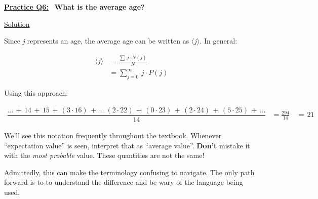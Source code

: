 \underline{\textbf{Practice Q6:}} \ \textbf{What is the average age?}

\bigskip

\underline{Solution}

Since \textit{j} represents an age, the average age can be written as
$\langle j \rangle$. In general:

\begin{align*}
    \langle j \rangle &= \frac{\sum \, j \cdot N(j)}{N} \\[1.5ex]
    &= \sum_{j=0}^{\infty} \, j \cdot P(j)
\end{align*}

\newpage

Using this approach:

\begin{align*}
    \dfrac{\dots \, + \, 14 \, + \, 15 \, + \, (3 \cdot 16) \, + \, \dots \,
    (2 \cdot 22) \, + \, (0 \cdot 23) \, + \, (2 \cdot 24) \, + \,
    (5 \cdot 25) \, + \, \dots}{14} &= \frac{294}{14}
    \, &= \, \boxed{21}
\end{align*}

\bigskip

We'll see this notation frequently throughout the textbook. Whenever ``expectation value'' is seen, interpret that as
``average value''. \textbf{Don't} mistake it with the \textit{most probable} value. These quantities are not the same!


Admittedly, this can make the terminology confusing to navigate. The only path forward is to to understand the
difference and be wary of the language being used.